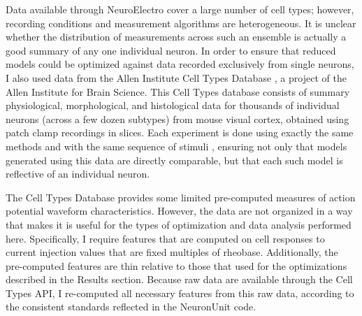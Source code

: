 Data available through NeuroElectro cover a large number of cell types; however, recording conditions and measurement algorithms are heterogeneous.
It is unclear whether the distribution of measurements across such an ensemble is actually a good summary of any one individual neuron.
In order to ensure that reduced models could be optimized against data recorded exclusively from single neurons, I also used data from the Allen Institute Cell Types Database \citep{celltypes}, a project of the Allen Institute for Brain Science.
This Cell Types database consists of summary physiological, morphological, and histological data for thousands of individual neurons (across a few dozen subtypes) from mouse visual cortex, obtained using patch clamp recordings in slices.
Each experiment is done using exactly the same methods and with the same sequence of stimuli \citep{celltypes}, ensuring not only that models generated using this data are directly comparable, but that each such model is reflective of an individual neuron.

The Cell Types Database provides some limited pre-computed measures of action potential waveform characteristics. 
However, the data are not organized in a way that makes it is useful for the types of optimization and data analysis performed here.
Specifically, I require features that are computed on cell responses to current injection values that are fixed multiples of rheobase.
Additionally, the pre-computed features are thin relative to those that used for the optimizations described in the Results section.
Because raw data are available through the Cell Types API, I re-computed all necessary features from this raw data, according to the consistent standards reflected in the NeuronUnit code.

